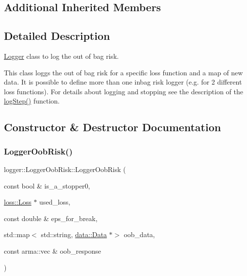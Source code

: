 \subsection*{Additional Inherited Members}


\subsection{Detailed Description}
\hyperlink{classlogger_1_1_logger}{Logger} class to log the out of bag risk. 

This class loggs the out of bag risk for a specific loss function and a map of new data. It is possible to define more than one inbag risk logger (e.\+g. for 2 different loss functions). For details about logging and stopping see the description of the {\ttfamily \hyperlink{classlogger_1_1_logger_oob_risk_a4b0ea670a7970bca31037efab99cc06a}{log\+Step()}} function. 

\subsection{Constructor \& Destructor Documentation}
\mbox{\label{classlogger_1_1_logger_oob_risk_a2ade553132c86f485d0057b2808ab028}} 
\subsubsection{\texorpdfstring{Logger\+Oob\+Risk()}{LoggerOobRisk()}}
{\footnotesize\ttfamily logger\+::\+Logger\+Oob\+Risk\+::\+Logger\+Oob\+Risk (\begin{DoxyParamCaption}\item[{const bool \&}]{is\+\_\+a\+\_\+stopper0,  }\item[{\hyperlink{classloss_1_1_loss}{loss\+::\+Loss} $\ast$}]{used\+\_\+loss,  }\item[{const double \&}]{eps\+\_\+for\+\_\+break,  }\item[{std\+::map$<$ std\+::string, \hyperlink{classdata_1_1_data}{data\+::\+Data} $\ast$$>$}]{oob\+\_\+data,  }\item[{const arma\+::vec \&}]{oob\+\_\+response }\end{DoxyParamCaption})}



